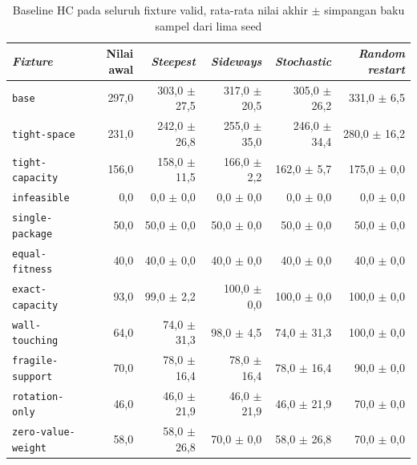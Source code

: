 \begin{table}[H]
    \centering
    \footnotesize
    \caption{Baseline HC pada seluruh fixture valid, rata-rata nilai akhir $\pm$ simpangan baku sampel dari lima seed}
    \label{tab:hc-fixture-baseline}
    \begin{tabular}{@{}lrrrrr@{}}
        \toprule
        \textit{Fixture}           & Nilai awal & \textit{Steepest}  & \textit{Sideways} & \textit{Stochastic} & \textit{Random restart} \\
        \midrule
        \texttt{base}              & 297,0      & 303,0 $\pm$ 27,5   & 317,0 $\pm$ 20,5  & 305,0 $\pm$ 26,2    & 331,0 $\pm$ 6,5         \\
        \texttt{tight-space}       & 231,0      & 242,0 $\pm$ 26,8   & 255,0 $\pm$ 35,0  & 246,0 $\pm$ 34,4    & 280,0 $\pm$ 16,2        \\
        \texttt{tight-capacity}    & 156,0      & 158,0 $\pm$ 11,5   & 166,0 $\pm$ 2,2   & 162,0 $\pm$ 5,7     & 175,0 $\pm$ 0,0         \\
        \texttt{infeasible}        & 0,0        & 0,0 $\pm$ 0,0      & 0,0 $\pm$ 0,0     & 0,0 $\pm$ 0,0       & 0,0 $\pm$ 0,0           \\
        \texttt{single-package}    & 50,0       & 50,0 $\pm$ 0,0     & 50,0 $\pm$ 0,0    & 50,0 $\pm$ 0,0      & 50,0 $\pm$ 0,0          \\
        \texttt{equal-fitness}     & 40,0       & 40,0 $\pm$ 0,0     & 40,0 $\pm$ 0,0    & 40,0 $\pm$ 0,0      & 40,0 $\pm$ 0,0          \\
        \texttt{exact-capacity}    & 93,0       & 99,0 $\pm$ 2,2     & 100,0 $\pm$ 0,0   & 100,0 $\pm$ 0,0     & 100,0 $\pm$ 0,0         \\
        \texttt{wall-touching}     & 64,0       & 74,0 $\pm$ 31,3    & 98,0 $\pm$ 4,5    & 74,0 $\pm$ 31,3     & 100,0 $\pm$ 0,0         \\
        \texttt{fragile-support}   & 70,0       & 78,0 $\pm$ 16,4    & 78,0 $\pm$ 16,4   & 78,0 $\pm$ 16,4     & 90,0 $\pm$ 0,0          \\
        \texttt{rotation-only}     & 46,0       & 46,0 $\pm$ 21,9    & 46,0 $\pm$ 21,9   & 46,0 $\pm$ 21,9     & 70,0 $\pm$ 0,0          \\
        \texttt{zero-value-weight} & 58,0       & 58,0 $\pm$ 26,8    & 70,0 $\pm$ 0,0    & 58,0 $\pm$ 26,8     & 70,0 $\pm$ 0,0          \\
        \bottomrule
    \end{tabular}
\end{table}

